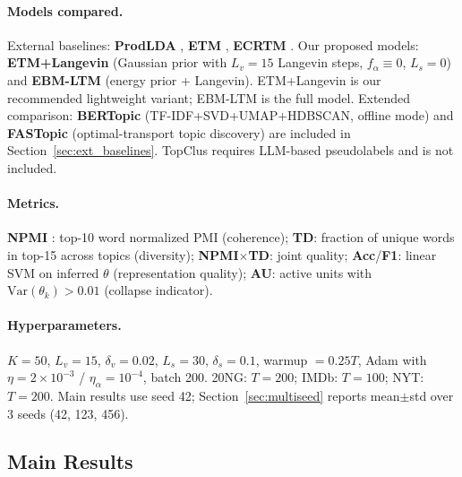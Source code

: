 \documentclass[10pt]{article}
\begin{document}
\paragraph{Models compared.}
External baselines: \textbf{ProdLDA} \citep{srivastava2017},
\textbf{ETM} \citep{dieng2020}, \textbf{ECRTM} \citep{wu2023}.
Our proposed models: \textbf{ETM+Langevin} (Gaussian prior with $L_v{=}15$ Langevin steps,
$f_\alpha \equiv 0$, $L_s{=}0$) and \textbf{EBM-LTM} (energy prior + Langevin).
ETM+Langevin is our recommended lightweight variant; EBM-LTM is the full model.
Extended comparison: \textbf{BERTopic} \citep{grootendorst2022} (TF-IDF+SVD+UMAP+HDBSCAN,
offline mode) and \textbf{FASTopic} \citep{wu2024fastopic} (optimal-transport topic
discovery) are included in Section~\ref{sec:ext_baselines}.
TopClus requires LLM-based pseudolabels and is not included.

\paragraph{Metrics.}
\textbf{NPMI} \citep{lau2014}: top-10 word normalized PMI (coherence);
\textbf{TD}: fraction of unique words in top-15 across topics (diversity);
\textbf{NPMI$\times$TD}: joint quality;
\textbf{Acc}/\textbf{F1}: linear SVM on inferred $\theta$ (representation quality);
\textbf{AU}: active units with $\mathrm{Var}(\theta_k) > 0.01$ (collapse indicator).

\paragraph{Hyperparameters.}
$K=50$, $L_v{=}15$, $\delta_v{=}0.02$, $L_s{=}30$, $\delta_s{=}0.1$,
warmup $= 0.25T$, Adam with $\eta{=}2\times10^{-3}$ / $\eta_\alpha{=}10^{-4}$,
batch 200. 20NG: $T=200$; IMDb: $T=100$; NYT: $T=200$. Main results use seed 42;
Section~\ref{sec:multiseed} reports mean$\pm$std over 3 seeds (42, 123, 456).

\subsection{Main Results}
\label{sec:main_results}
\end{document}
